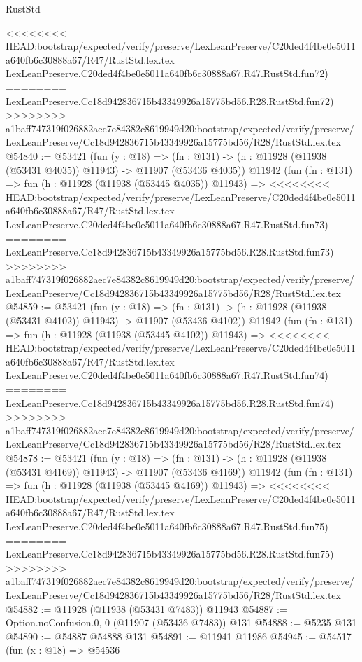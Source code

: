 \begin{lexlean}{RustStd}
\begin{coremodule}
{\begin{coremodule}
{{{{{{{{{{{{{{{{{{{{{{{{{{{{{{{{{{{{{{{{{{{{{{{{{{{{{{{{{{{{{{{{{{{{{{{{{{{{{{{{<<<<<<<< HEAD:bootstrap/expected/verify/preserve/LexLeanPreserve/C20ded4f4be0e5011a640fb6c30888a67/R47/RustStd.lex.tex
    LexLeanPreserve.C20ded4f4be0e5011a640fb6c30888a67.R47.RustStd.fun72)
========
    LexLeanPreserve.Cc18d942836715b43349926a15775bd56.R28.RustStd.fun72)
>>>>>>>> a1baff747319f026882aec7e84382c8619949d20:bootstrap/expected/verify/preserve/LexLeanPreserve/Cc18d942836715b43349926a15775bd56/R28/RustStd.lex.tex
@54840 := @53421
    (fun (y : @18) =>
    (fn : @131) -> (h : @11928 (@11938 (@53431 @4035)) @11943) -> @11907 (@53436 @4035))
    @11942
    (fun (fn : @131) =>
    fun (h : @11928 (@11938 (@53445 @4035)) @11943) =>
<<<<<<<< HEAD:bootstrap/expected/verify/preserve/LexLeanPreserve/C20ded4f4be0e5011a640fb6c30888a67/R47/RustStd.lex.tex
    LexLeanPreserve.C20ded4f4be0e5011a640fb6c30888a67.R47.RustStd.fun73)
========
    LexLeanPreserve.Cc18d942836715b43349926a15775bd56.R28.RustStd.fun73)
>>>>>>>> a1baff747319f026882aec7e84382c8619949d20:bootstrap/expected/verify/preserve/LexLeanPreserve/Cc18d942836715b43349926a15775bd56/R28/RustStd.lex.tex
@54859 := @53421
    (fun (y : @18) =>
    (fn : @131) -> (h : @11928 (@11938 (@53431 @4102)) @11943) -> @11907 (@53436 @4102))
    @11942
    (fun (fn : @131) =>
    fun (h : @11928 (@11938 (@53445 @4102)) @11943) =>
<<<<<<<< HEAD:bootstrap/expected/verify/preserve/LexLeanPreserve/C20ded4f4be0e5011a640fb6c30888a67/R47/RustStd.lex.tex
    LexLeanPreserve.C20ded4f4be0e5011a640fb6c30888a67.R47.RustStd.fun74)
========
    LexLeanPreserve.Cc18d942836715b43349926a15775bd56.R28.RustStd.fun74)
>>>>>>>> a1baff747319f026882aec7e84382c8619949d20:bootstrap/expected/verify/preserve/LexLeanPreserve/Cc18d942836715b43349926a15775bd56/R28/RustStd.lex.tex
@54878 := @53421
    (fun (y : @18) =>
    (fn : @131) -> (h : @11928 (@11938 (@53431 @4169)) @11943) -> @11907 (@53436 @4169))
    @11942
    (fun (fn : @131) =>
    fun (h : @11928 (@11938 (@53445 @4169)) @11943) =>
<<<<<<<< HEAD:bootstrap/expected/verify/preserve/LexLeanPreserve/C20ded4f4be0e5011a640fb6c30888a67/R47/RustStd.lex.tex
    LexLeanPreserve.C20ded4f4be0e5011a640fb6c30888a67.R47.RustStd.fun75)
========
    LexLeanPreserve.Cc18d942836715b43349926a15775bd56.R28.RustStd.fun75)
>>>>>>>> a1baff747319f026882aec7e84382c8619949d20:bootstrap/expected/verify/preserve/LexLeanPreserve/Cc18d942836715b43349926a15775bd56/R28/RustStd.lex.tex
@54882 := @11928 (@11938 (@53431 @7483)) @11943
@54887 := Option.noConfusion.{0, 0} (@11907 (@53436 @7483)) @131
@54888 := @5235 @131
@54890 := @54887 @54888 @131
@54891 := @11941 @11986
@54945 := @54517
    (fun (x : @18) =>
    @54536
}}}}}}}}}}}}}}}}}}}}}}}}}}}}}}}}}}}}}}}}}}}}}}}}}}}}}}}}}}}}}}}}}}}}}}}}}}}}}}}}
\end{coremodule}}
\end{coremodule}
\end{lexlean}
